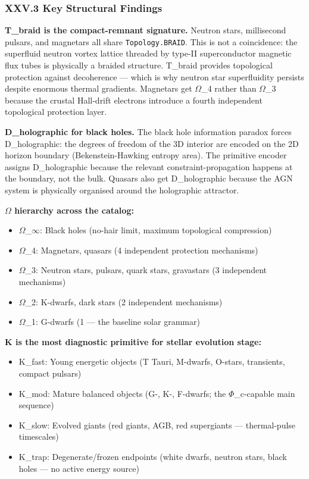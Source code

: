 \documentclass[12pt,a4paper]{article}
\begin{document}
\subsubsection{XXV.3 Key Structural Findings}

\textbf{T\_braid is the compact-remnant signature.} Neutron stars, millisecond pulsars, and magnetars all share \texttt{Topology.BRAID}. This is not a coincidence: the superfluid neutron vortex lattice threaded by type-II superconductor magnetic flux tubes is physically a braided structure. T\_braid provides topological protection against decoherence --- which is why neutron star superfluidity persists despite enormous thermal gradients. Magnetars get $\Omega$\_4 rather than $\Omega$\_3 because the crustal Hall-drift electrons introduce a fourth independent topological protection layer.

\textbf{D\_holographic for black holes.} The black hole information paradox forces D\_holographic: the degrees of freedom of the 3D interior are encoded on the 2D horizon boundary (Bekenstein-Hawking entropy \propto area). The primitive encoder assigns D\_holographic because the relevant constraint-propagation happens at the boundary, not the bulk. Quasars also get D\_holographic because the AGN system is physically organised around the holographic attractor.

\textbf{$\Omega$ hierarchy across the catalog:}

\begin{itemize}
    \item $\Omega$\_$\infty$: Black holes (no-hair limit, maximum topological compression)
    \item $\Omega$\_4: Magnetars, quasars (4 independent protection mechanisms)
    \item $\Omega$\_3: Neutron stars, pulsars, quark stars, gravastars (3 independent mechanisms)
    \item $\Omega$\_2: K-dwarfs, dark stars (2 independent mechanisms)
    \item $\Omega$\_1: G-dwarfs (1 --- the baseline solar grammar)
\end{itemize}

\textbf{K is the most diagnostic primitive for stellar evolution stage:}

\begin{itemize}
    \item K\_fast: Young energetic objects (T Tauri, M-dwarfs, O-stars, transients, compact pulsars)
    \item K\_mod: Mature balanced objects (G-, K-, F-dwarfs; the $\Phi$\_c-capable main sequence)
    \item K\_slow: Evolved giants (red giants, AGB, red supergiants --- thermal-pulse timescales)
    \item K\_trap: Degenerate/frozen endpoints (white dwarfs, neutron stars, black holes --- no active energy source)
\end{itemize}
\end{document}
